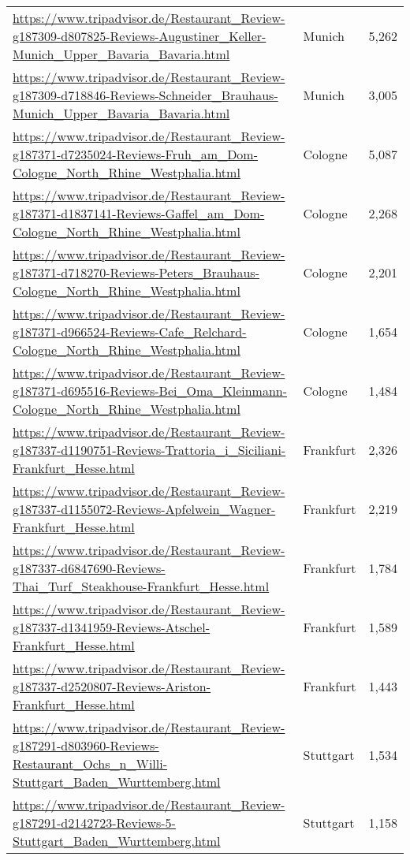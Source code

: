 \begin{table}[H]
{\begin{tabular}{llr}
\url{https://www.tripadvisor.de/Restaurant\_Review-g187309-d807825-Reviews-Augustiner\_Keller-Munich\_Upper\_Bavaria\_Bavaria.html} & Munich & 5,262 \\ 
\url{https://www.tripadvisor.de/Restaurant\_Review-g187309-d718846-Reviews-Schneider\_Brauhaus-Munich\_Upper\_Bavaria\_Bavaria.html} & Munich & 3,005 \\ 
\url{https://www.tripadvisor.de/Restaurant\_Review-g187371-d7235024-Reviews-Fruh\_am\_Dom-Cologne\_North\_Rhine\_Westphalia.html} & Cologne & 5,087 \\ 
\url{https://www.tripadvisor.de/Restaurant\_Review-g187371-d1837141-Reviews-Gaffel\_am\_Dom-Cologne\_North\_Rhine\_Westphalia.html} & Cologne & 2,268 \\ 
\url{https://www.tripadvisor.de/Restaurant\_Review-g187371-d718270-Reviews-Peters\_Brauhaus-Cologne\_North\_Rhine\_Westphalia.html} & Cologne & 2,201 \\ 
\url{https://www.tripadvisor.de/Restaurant\_Review-g187371-d966524-Reviews-Cafe\_Relchard-Cologne\_North\_Rhine\_Westphalia.html} & Cologne & 1,654 \\ 
\url{https://www.tripadvisor.de/Restaurant\_Review-g187371-d695516-Reviews-Bei\_Oma\_Kleinmann-Cologne\_North\_Rhine\_Westphalia.html} & Cologne & 1,484 \\ 
\url{https://www.tripadvisor.de/Restaurant\_Review-g187337-d1190751-Reviews-Trattoria\_i\_Siciliani-Frankfurt\_Hesse.html} & Frankfurt & 2,326 \\ 
\url{https://www.tripadvisor.de/Restaurant\_Review-g187337-d1155072-Reviews-Apfelwein\_Wagner-Frankfurt\_Hesse.html} & Frankfurt & 2,219 \\ 
\url{https://www.tripadvisor.de/Restaurant\_Review-g187337-d6847690-Reviews-Thai\_Turf\_Steakhouse-Frankfurt\_Hesse.html} & Frankfurt & 1,784 \\ 
\url{https://www.tripadvisor.de/Restaurant\_Review-g187337-d1341959-Reviews-Atschel-Frankfurt\_Hesse.html} & Frankfurt & 1,589 \\ 
\url{https://www.tripadvisor.de/Restaurant\_Review-g187337-d2520807-Reviews-Ariston-Frankfurt\_Hesse.html} & Frankfurt & 1,443 \\ 
\url{https://www.tripadvisor.de/Restaurant\_Review-g187291-d803960-Reviews-Restaurant\_Ochs\_n\_Willi-Stuttgart\_Baden\_Wurttemberg.html} & Stuttgart & 1,534 \\ 
\url{https://www.tripadvisor.de/Restaurant\_Review-g187291-d2142723-Reviews-5-Stuttgart\_Baden\_Wurttemberg.html} & Stuttgart & 1,158 \\ 

\end{tabular}}
\end{table}
